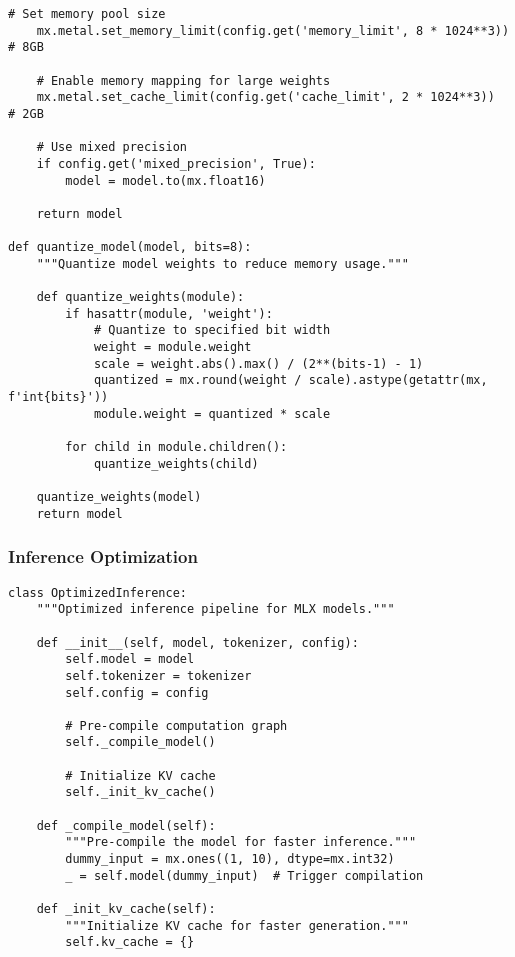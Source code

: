 \begin{table}[H]
\begin{lstlisting}[caption=MLX memory optimization implementation,label=lst:mlx-memory]
    # Set memory pool size
    mx.metal.set_memory_limit(config.get('memory_limit', 8 * 1024**3))  # 8GB
    
    # Enable memory mapping for large weights
    mx.metal.set_cache_limit(config.get('cache_limit', 2 * 1024**3))    # 2GB
    
    # Use mixed precision
    if config.get('mixed_precision', True):
        model = model.to(mx.float16)
    
    return model

def quantize_model(model, bits=8):
    """Quantize model weights to reduce memory usage."""
    
    def quantize_weights(module):
        if hasattr(module, 'weight'):
            # Quantize to specified bit width
            weight = module.weight
            scale = weight.abs().max() / (2**(bits-1) - 1)
            quantized = mx.round(weight / scale).astype(getattr(mx, f'int{bits}'))
            module.weight = quantized * scale
        
        for child in module.children():
            quantize_weights(child)
    
    quantize_weights(model)
    return model
\end{lstlisting}

\subsubsection{Inference Optimization}

\begin{lstlisting}[caption=Optimized inference implementation,label=lst:inference-opt]
class OptimizedInference:
    """Optimized inference pipeline for MLX models."""
    
    def __init__(self, model, tokenizer, config):
        self.model = model
        self.tokenizer = tokenizer
        self.config = config
        
        # Pre-compile computation graph
        self._compile_model()
        
        # Initialize KV cache
        self._init_kv_cache()
    
    def _compile_model(self):
        """Pre-compile the model for faster inference."""
        dummy_input = mx.ones((1, 10), dtype=mx.int32)
        _ = self.model(dummy_input)  # Trigger compilation
    
    def _init_kv_cache(self):
        """Initialize KV cache for faster generation."""
        self.kv_cache = {}
        

\end{lstlisting}
\end{table}
